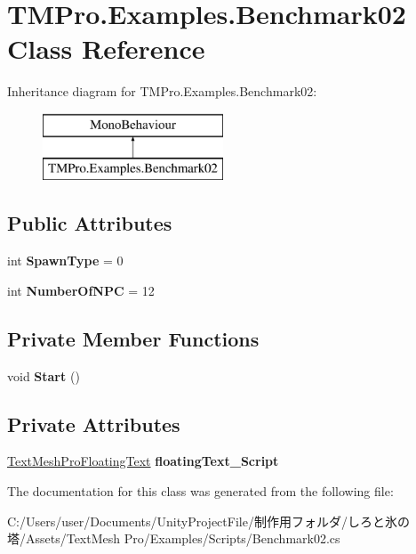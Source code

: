\hypertarget{class_t_m_pro_1_1_examples_1_1_benchmark02}{}\section{T\+M\+Pro.\+Examples.\+Benchmark02 Class Reference}
\label{class_t_m_pro_1_1_examples_1_1_benchmark02}
Inheritance diagram for T\+M\+Pro.\+Examples.\+Benchmark02\+:\begin{figure}[H]
\begin{center}
\leavevmode
\includegraphics[height=2.000000cm]{class_t_m_pro_1_1_examples_1_1_benchmark02}
\end{center}
\end{figure}
\subsection*{Public Attributes}
\begin{DoxyCompactItemize}
\item 
\mbox{\label{class_t_m_pro_1_1_examples_1_1_benchmark02_a2a32f6a6d5ecd16e70c8174957234158}} 
int {\bfseries Spawn\+Type} = 0
\item 
\mbox{\label{class_t_m_pro_1_1_examples_1_1_benchmark02_ab564edc57654d2d1a52a5dd012f3b63e}} 
int {\bfseries Number\+Of\+N\+PC} = 12
\end{DoxyCompactItemize}
\subsection*{Private Member Functions}
\begin{DoxyCompactItemize}
\item 
\mbox{\label{class_t_m_pro_1_1_examples_1_1_benchmark02_ad079cdf95753c6a6d92cd89b72d5f637}} 
void {\bfseries Start} ()
\end{DoxyCompactItemize}
\subsection*{Private Attributes}
\begin{DoxyCompactItemize}
\item 
\mbox{\label{class_t_m_pro_1_1_examples_1_1_benchmark02_a6517c4d88f4f61f3b4f9032310d0b734}} 
\hyperlink{class_t_m_pro_1_1_examples_1_1_text_mesh_pro_floating_text}{Text\+Mesh\+Pro\+Floating\+Text} {\bfseries floating\+Text\+\_\+\+Script}
\end{DoxyCompactItemize}


The documentation for this class was generated from the following file\+:\begin{DoxyCompactItemize}
\item 
C\+:/\+Users/user/\+Documents/\+Unity\+Project\+File/制作用フォルダ/しろと氷の塔/\+Assets/\+Text\+Mesh Pro/\+Examples/\+Scripts/Benchmark02.\+cs\end{DoxyCompactItemize}
